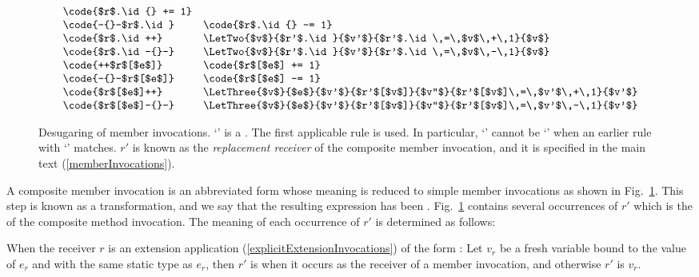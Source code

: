\documentclass[makeidx]{article}
\begin{document}
{\begin{figure}[t]
\begin{minipage}[h]{\textwidth}
\begin{displaymath}
\begin{array}{ll}
        \code{$r$.\id{} += 1}
        \\
        \code{-{}-$r$.\id} &
        \code{$r$.\id{} -= 1}
        \\
        \code{$r$.\id++} &
        \LetTwo{$v$}{$r'$.\id}{$v'$}{$r'$.\id\,=\,$v$\,+\,1}{$v$}
        \\
        \code{$r$.\id-{}-} &
        \LetTwo{$v$}{$r'$.\id}{$v'$}{$r'$.\id\,=\,$v$\,-\,1}{$v$}
        \\
        \code{++$r$[$e$]} &
        \code{$r$[$e$] += 1}
        \\
        \code{-{}-$r$[$e$]} &
        \code{$r$[$e$] -= 1}
        \\
        \code{$r$[$e$]++} &
        \LetThree{$v$}{$e$}{$v'$}{$r'$[$v$]}{$v''$}{%
          $r'$[$v$]\,=\,$v'$\,+\,1}{$v'$}
        \\
        \code{$r$[$e$]-{}-} &
        \LetThree{$v$}{$e$}{$v'$}{$r'$[$v$]}{$v''$}{%
          $r'$[$v$]\,=\,$v'$\,-\,1}{$v'$}
      \end{array}
    \end{displaymath}
  \end{minipage}
  \caption{Desugaring of member invocations.
    `\code{$\otimes$=}' is a .
    The first applicable rule is used.
    In particular, `\code{$\otimes$=}' cannot be `'
    when an earlier rule with `' matches.
    $r'$ is known as the \emph{replacement receiver} of
    the composite member invocation,
    and it is specified in the main text
    (\ref{memberInvocations}).}
  \label{fig:desugarCompositeMemberInvocations}
\end{figure}

\LMHash{}%
A composite member invocation is an abbreviated form
whose meaning is reduced to simple member invocations
as shown in Fig.~\ref{fig:desugarCompositeMemberInvocations}.
This step is known as a  transformation,
and we say that the resulting expression has been .
Fig.~\ref{fig:desugarCompositeMemberInvocations} contains
several occurrences of $r'$
which is the
of the composite method invocation.
The meaning of each occurrence of $r'$ is determined as follows:

\LMHash{}%
When the receiver $r$ is an extension application
(\ref{explicitExtensionInvocations})
of the form 
:
Let $v_r$ be a fresh variable bound to the value of $e_r$
and with the same static type as $e_r$,
then $r'$ is  when it occurs
as the receiver of a member invocation,
and otherwise $r'$ is $v_r$.

}
\end{document}
